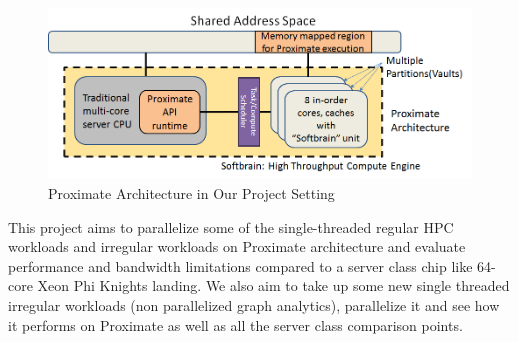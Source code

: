\begin{figure}
  \begin{center}
    \includegraphics[width=\linewidth]{cs758-figs/proj.png}
  \end{center}
\vspace{-0.9in}
  \caption{Proximate Architecture in Our Project Setting}
  \label{fig:prx}
\vspace{-0.05in}
\end{figure}



This project aims to parallelize some of the 
single-threaded regular HPC workloads and 
irregular workloads on Proximate architecture 
and evaluate performance and bandwidth 
limitations compared to a server class chip 
like 64-core Xeon Phi Knights landing.
We also aim to take up some new single threaded irregular workloads (non parallelized graph
analytics), parallelize it and see how it performs on Proximate as well as all the server class comparison points. 



